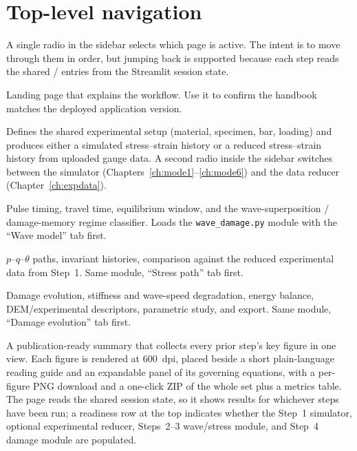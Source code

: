 \documentclass[11pt,a4paper,openany]{book}
\providecommand{\SI}[2]{\qty{#1}{#2}}
\theoremstyle{handbook}
\begin{document}
\section{Top-level navigation}

A single radio in the sidebar selects which page is active. The intent is
to move through them in order, but jumping back is supported because each
step reads the shared
/ entries
from the Streamlit session state.

\begin{description}[leftmargin=2em,style=nextline]
  \item[Overview] Landing page that explains the workflow. Use it to
    confirm the handbook matches the deployed application version.
  \item[Step 1: Setup, simulator and data]
    Defines the shared experimental setup (material, specimen, bar,
    loading) and produces either a simulated stress--strain history or a
    reduced stress--strain history from uploaded gauge data. A second
    radio inside the sidebar switches between the simulator
    (Chapters~\ref{ch:mode1}--\ref{ch:mode6}) and the data reducer
    (Chapter~\ref{ch:expdata}).
  \item[Step 2: Wave model]
    Pulse timing, travel time, equilibrium window, and the
    wave-superposition / damage-memory regime classifier. Loads the
    \texttt{wave\_damage.py} module with the ``Wave model'' tab first.
  \item[Step 3: Stress path and analysis]
    $p$--$q$--$\theta$ paths, invariant histories, comparison against the
    reduced experimental data from Step~1. Same module, ``Stress path''
    tab first.
  \item[Step 4: Damage model and DEM validation]
    Damage evolution, stiffness and wave-speed degradation, energy
    balance, DEM/experimental descriptors, parametric study, and export.
    Same module, ``Damage evolution'' tab first.
  \item[Step 5: Summary of Results]
    A publication-ready summary that collects every prior step's key figure
    in one view. Each figure is rendered at \SI{600}{dpi}, placed beside a
    short plain-language reading guide and an expandable panel of its
    governing equations, with a per-figure PNG download and a one-click ZIP
    of the whole set plus a metrics table. The page reads the shared session
    state, so it shows results for whichever steps have been run; a readiness
    row at the top indicates whether the Step~1 simulator, optional
    experimental reducer, Steps~2--3 wave/stress module, and Step~4 damage
    module are populated.
\end{description}
\end{document}
